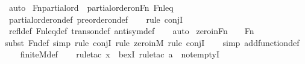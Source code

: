 \begin{isabellebody}
\ auto\isanewline
{}\isamarkupfalse%
%
\endisatagproof
{\isafoldproof}%
%
\isadelimproof
\isanewline
%
\endisadelimproof
\isanewline
{}\isamarkupfalse%
\ Fn{\isacharunderscore}{\kern0pt}partial{\isacharunderscore}{\kern0pt}ord\ {\isacharcolon}{\kern0pt}\ {\isachardoublequoteopen}partial{\isacharunderscore}{\kern0pt}order{\isacharunderscore}{\kern0pt}on{\isacharparenleft}{\kern0pt}Fn{\isacharcomma}{\kern0pt}\ Fn{\isacharunderscore}{\kern0pt}leq{\isacharparenright}{\kern0pt}{\isachardoublequoteclose}\ \isanewline
%
\isadelimproof
\ \ %
\endisadelimproof
%
\isatagproof
{}\isamarkupfalse%
\ partial{\isacharunderscore}{\kern0pt}order{\isacharunderscore}{\kern0pt}on{\isacharunderscore}{\kern0pt}def\ preorder{\isacharunderscore}{\kern0pt}on{\isacharunderscore}{\kern0pt}def\ \isanewline
\ \ \isamarkupfalse%
{\isacharparenleft}{\kern0pt}rule\ conjI{\isacharparenright}{\kern0pt}{\isacharplus}{\kern0pt}\isanewline
\ \ \isamarkupfalse%
\ refl{\isacharunderscore}{\kern0pt}def\ Fn{\isacharunderscore}{\kern0pt}leq{\isacharunderscore}{\kern0pt}def\ trans{\isacharunderscore}{\kern0pt}on{\isacharunderscore}{\kern0pt}def\ antisym{\isacharunderscore}{\kern0pt}def\isanewline
\ \ \isamarkupfalse%
\ auto%
\endisatagproof
{\isafoldproof}%
%
\isadelimproof
\isanewline
%
\endisadelimproof
\isanewline
{}\isamarkupfalse%
\ zero{\isacharunderscore}{\kern0pt}in{\isacharunderscore}{\kern0pt}Fn\ {\isacharcolon}{\kern0pt}\ {\isachardoublequoteopen}{}\ {\isasymin}\ Fn{\isachardoublequoteclose}\ \isanewline
%
\isadelimproof
\ \ %
\endisadelimproof
%
\isatagproof
{}\isamarkupfalse%
{\isacharparenleft}{\kern0pt}subst\ Fn{\isacharunderscore}{\kern0pt}def{\isacharcomma}{\kern0pt}\ simp{\isacharcomma}{\kern0pt}\ rule\ conjI{\isacharcomma}{\kern0pt}\ rule\ zero{\isacharunderscore}{\kern0pt}in{\isacharunderscore}{\kern0pt}M{\isacharcomma}{\kern0pt}\ rule\ conjI{\isacharparenright}{\kern0pt}\isanewline
\ \ \ \isamarkupfalse%
{\isacharparenleft}{\kern0pt}simp\ add{\isacharcolon}{\kern0pt}function{\isacharunderscore}{\kern0pt}def{\isacharparenright}{\kern0pt}\isanewline
\ \ \isamarkupfalse%
\ finite{\isacharunderscore}{\kern0pt}M{\isacharunderscore}{\kern0pt}def\ \isanewline
\ \ \isamarkupfalse%
{\isacharparenleft}{\kern0pt}rule{\isacharunderscore}{\kern0pt}tac\ x{\isacharequal}{\kern0pt}{}\ \ bexI{\isacharcomma}{\kern0pt}\ rule{\isacharunderscore}{\kern0pt}tac\ a{\isacharequal}{\kern0pt}{\isachardoublequoteopen}{}{\isachardoublequoteclose}\ \ not{\isacharunderscore}{\kern0pt}emptyI{\isacharparenright}{\kern0pt}\ \isanewline

\end{isabellebody}
